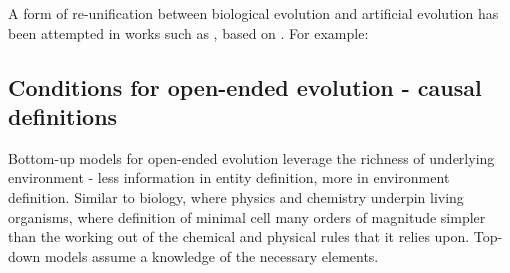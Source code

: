 A form of re-unification between biological evolution and artificial evolution has been attempted in works such as \parencite{Paixao2015}, based on . For example: 

\subsection{Conditions for open-ended evolution - causal definitions}

Bottom-up models for open-ended evolution leverage the richness of underlying environment - less information in entity definition, more in environment definition. Similar to biology, where physics and chemistry underpin living organisms, where definition of minimal cell many orders of magnitude simpler than the working out of the chemical and physical rules that it relies upon. Top-down models assume a knowledge of the necessary elements.


